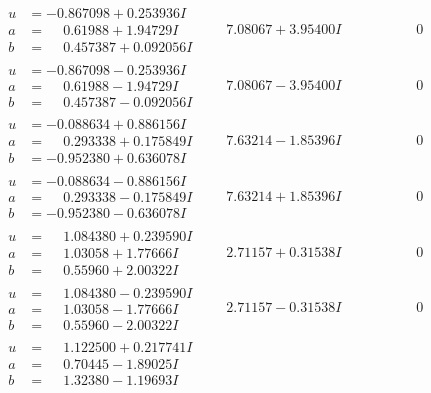 \documentclass[1p]{elsarticle_modified}
\theoremstyle{definition}
\begin{document}
$$\begin{array}{c|c|c}
\begin{aligned}
u &= -0.867098 + 0.253936 I \\
a &= \phantom{-}0.61988 + 1.94729 I \\
b &= \phantom{-}0.457387 + 0.092056 I\end{aligned}
 & \phantom{-}7.08067 + 3.95400 I & \phantom{-0.000000 } 0 \\ \hline\begin{aligned}
u &= -0.867098 - 0.253936 I \\
a &= \phantom{-}0.61988 - 1.94729 I \\
b &= \phantom{-}0.457387 - 0.092056 I\end{aligned}
 & \phantom{-}7.08067 - 3.95400 I & \phantom{-0.000000 } 0 \\ \hline\begin{aligned}
u &= -0.088634 + 0.886156 I \\
a &= \phantom{-}0.293338 + 0.175849 I \\
b &= -0.952380 + 0.636078 I\end{aligned}
 & \phantom{-}7.63214 - 1.85396 I & \phantom{-0.000000 } 0 \\ \hline\begin{aligned}
u &= -0.088634 - 0.886156 I \\
a &= \phantom{-}0.293338 - 0.175849 I \\
b &= -0.952380 - 0.636078 I\end{aligned}
 & \phantom{-}7.63214 + 1.85396 I & \phantom{-0.000000 } 0 \\ \hline\begin{aligned}
u &= \phantom{-}1.084380 + 0.239590 I \\
a &= \phantom{-}1.03058 + 1.77666 I \\
b &= \phantom{-}0.55960 + 2.00322 I\end{aligned}
 & \phantom{-}2.71157 + 0.31538 I & \phantom{-0.000000 } 0 \\ \hline\begin{aligned}
u &= \phantom{-}1.084380 - 0.239590 I \\
a &= \phantom{-}1.03058 - 1.77666 I \\
b &= \phantom{-}0.55960 - 2.00322 I\end{aligned}
 & \phantom{-}2.71157 - 0.31538 I & \phantom{-0.000000 } 0 \\ \hline\begin{aligned}
u &= \phantom{-}1.122500 + 0.217741 I \\
a &= \phantom{-}0.70445 - 1.89025 I \\
b &= \phantom{-}1.32380 - 1.19693 I\end{aligned}

\end{array}$$
\end{document}
